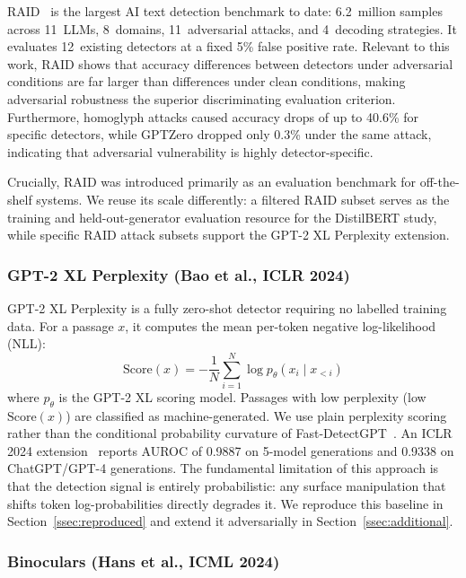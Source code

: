 \documentclass[conference]{IEEEtran}
\begin{document}
RAID~\cite{dugan2024} is the largest AI text detection benchmark to date:
6.2~million samples across 11~LLMs, 8~domains, 11~adversarial attacks, and
4~decoding strategies. It evaluates 12~existing detectors at a fixed 5\%
false positive rate. Relevant to this work, RAID shows that accuracy
differences between detectors under adversarial conditions are far larger
than differences under clean conditions, making adversarial robustness the
superior discriminating evaluation criterion. Furthermore, homoglyph attacks
caused accuracy drops of up to 40.6\% for specific detectors, while GPTZero
dropped only 0.3\% under the same attack, indicating that adversarial
vulnerability is highly detector-specific.

Crucially, RAID was introduced primarily as an evaluation benchmark for
off-the-shelf systems. We reuse its scale differently: a filtered RAID subset
serves as the training and held-out-generator evaluation resource for the
DistilBERT study, while specific RAID attack subsets support the GPT-2 XL Perplexity
extension.

\subsubsection{GPT-2 XL Perplexity (Bao et al., ICLR 2024)}

GPT-2 XL Perplexity is a fully zero-shot detector requiring no
labelled training data. For a passage $x$, it computes the mean
per-token negative log-likelihood (NLL):
\begin{equation}
\text{Score}(x) = -\frac{1}{N}\sum_{i=1}^{N} \log p_\theta(x_i \mid x_{<i})
\end{equation}
where $p_\theta$ is the GPT-2 XL scoring model. Passages with
low perplexity (low $\text{Score}(x)$) are classified as
machine-generated. We use plain perplexity scoring rather than the
conditional probability curvature of Fast-DetectGPT~\cite{bao2024}.
An ICLR 2024 extension~\cite{bao2024} reports AUROC of 0.9887 on 5-model
generations and 0.9338 on ChatGPT/GPT-4 generations. The fundamental
limitation of this approach is that the detection signal is entirely
probabilistic: any surface manipulation that shifts token log-probabilities
directly degrades it. We reproduce this baseline in Section~\ref{ssec:reproduced}
and extend it adversarially in Section~\ref{ssec:additional}.

\subsubsection{Binoculars (Hans et al., ICML 2024)}
\end{document}
